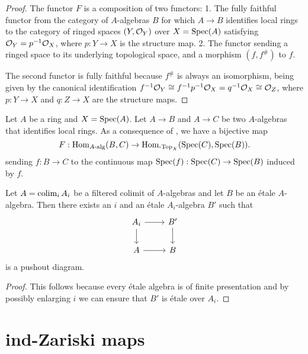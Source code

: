 \begin{proof}
The functor \(F\) is a composition of two functors:
1. The fully faithful functor from the category of \(A\)-algebras \(B\) for which \(A \to B\) identifies local rings to the category of ringed spaces \((Y, {\mathcal{O}}_Y)\) over \(X = \operatorname{Spec}(A)\) satisfying \({\mathcal{O}}_Y = p^{-1}{\mathcal{O}}_X\), where \(p: Y \to X\) is the structure map.
2. The functor sending a ringed space to its underlying topological space, and a morphism \((f, f^\#)\) to \(f\).

The second functor is fully faithful because \(f^\#\) is always an isomorphism, being given by the canonical identification \(f^{-1}{\mathcal{O}}_Y \cong f^{-1}p^{-1}{\mathcal{O}}_X = q^{-1}{\mathcal{O}}_X \cong {\mathcal{O}}_Z\), where \(p: Y \to X\) and \(q: Z \to X\) are the structure maps.
\end{proof}

\begin{definition}
  \label{def:identifies-local-ring-hom-set-bijection}
  Let \(A\) be a ring and \(X = \operatorname{Spec}(A)\). Let \(A \to B\) and \(A \to C\) be two \(A\)-algebras that identifies local rings. As a consequence of , we have a bijective map 
  \[F : \operatorname{Hom}_{A\textnormal{-alg}}(B, C) \to \operatorname{Hom}_{\textnormal{-Top}_X}(\operatorname{Spec}(C), \operatorname{Spec}(B)).\]
  sending \(f : B \to C\) to the continuous map \(\operatorname{Spec}(f) : \operatorname{Spec}(C) \to \operatorname{Spec}(B)\) induced by \(f\).
\end{definition}

\begin{lemma}
    Let $A = \operatorname{colim}_i A_i$ be a filtered colimit of $A$-algebras and let $B$ be an étale $A$-algebra. Then
    there exists an $i$ and an étale $A_i$-algebra $B'$ such that
    \[
    \begin{tikzcd}
        A_i \arrow{r} \arrow{d} & B' \arrow{d} \\
        A \arrow{r} & B
    \end{tikzcd}
    \] is a pushout diagram.
    \label{lemma:etale-ind-spreads}
\end{lemma}

\begin{proof}
    This follows because every étale algebra is of finite presentation and by possibly enlarging $i$ we can ensure
    that $B'$ is étale over $A_i$.
\end{proof}

\section{ind-Zariski maps}

